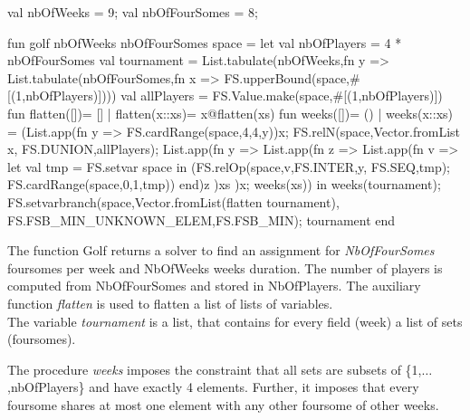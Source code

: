 \documentclass[a4paper]{scrartcl}
\begin{document}
\begin{myverbatim}
val nbOfWeeks = 9;
val nbOfFourSomes = 8;

fun golf nbOfWeeks nbOfFourSomes space =
  let
      val nbOfPlayers = 4 * nbOfFourSomes
      val tournament = List.tabulate(nbOfWeeks,fn y => 
                       List.tabulate(nbOfFourSomes,fn x =>
                       FS.upperBound(space,#[(1,nbOfPlayers)])))
      val allPlayers = FS.Value.make(space,#[(1,nbOfPlayers)])
      fun flatten([])= []
        | flatten(x::xs)= x@flatten(xs)
      fun weeks([])= ()
        | weeks(x::xs) = (List.app(fn y => 
                            FS.cardRange(space,4,4,y))x;
                          FS.relN(space,Vector.fromList x,
                                      FS.DUNION,allPlayers);
                          List.app(fn y =>
                           List.app(fn z => 
                            List.app(fn v =>
                             let
                                val tmp = FS.setvar space
                             in
                               (FS.relOp(space,v,FS.INTER,y,
                                            FS.SEQ,tmp);
                                FS.cardRange(space,0,1,tmp))
                             end)z   
                              )xs             
                            )x;
                           weeks(xs))
   in 
      weeks(tournament);
      FS.setvarbranch(space,Vector.fromList(flatten tournament),
                           FS.FSB_MIN_UNKNOWN_ELEM,FS.FSB_MIN);
      tournament
   end
        
\end{myverbatim}

The function Golf returns a solver to find an assignment 
for {\it NbOfFourSomes} foursomes per week and NbOfWeeks weeks 
duration. The number of players is computed from NbOfFourSomes 
and stored in NbOfPlayers. The auxiliary function {\it flatten} is 
used to flatten a list of lists of variables.\\ 

The variable {\it tournament} is a list, that contains for
every field (week) a list of sets (foursomes).

The procedure {\it weeks} imposes the constraint that
all sets are subsets of \{1,$\ldots$,nbOfPlayers\} 
and have exactly 4 elements. Further, it imposes 
that every foursome shares at most one element with any 
other foursome of other weeks.
\end{document}
